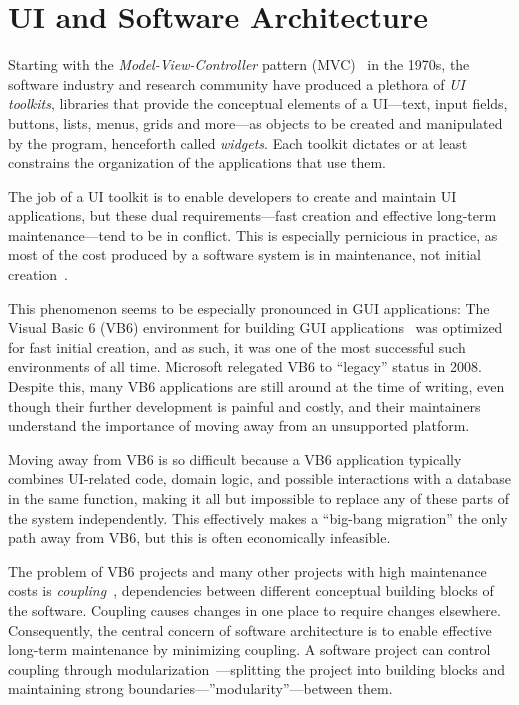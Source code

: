 \documentclass[sigplan,screen]{acmart}
\begin{document}
\section{UI and Software Architecture}
\label{sec:ui-and-architecture}

Starting with the \textit{Model-View-Controller} pattern
(MVC)~\cite{MVC} in the 1970s, the software
industry and research community have produced a plethora of \textit{UI
  toolkits}, libraries that provide the conceptual elements of a
UI---text, input fields, buttons, lists, menus, grids and more---as
objects to be created and manipulated by the program, henceforth
called \textit{widgets}.  Each toolkit dictates or at least
constrains the organization of the applications that use them.

The job of a UI toolkit is to enable developers to create and maintain
UI applications, but these dual requirements---fast creation and
effective long-term maintenance---tend to be in conflict.  This is especially pernicious in
practice, as most of the cost produced by a software system is in
maintenance, not initial creation~\cite{GreenBook}.

This phenomenon seems to be especially pronounced in GUI applications:
The Visual Basic 6 (VB6) environment for building GUI
applications~\cite{VB6} was optimized for fast initial creation, and
as such, it was one of the most successful such environments of all time.
Microsoft relegated VB6 to ``legacy'' status in 2008. Despite this,
many VB6 applications are still around at the time of writing, even
though their further development is painful and costly, and their
maintainers understand the importance of moving away from an
unsupported platform.

Moving away from VB6 is so difficult because a VB6 application
typically combines UI-related code, domain logic, and possible
interactions with a database in the same function, making it
all but impossible to replace any of these parts of the system
independently.  This effectively makes a ``big-bang migration'' the only
path away from VB6, but this is often economically
infeasible.

The problem of VB6 projects and many other projects with
high maintenance costs is \textit{coupling}~\cite{GreenBook},
dependencies between different conceptual building blocks of the
software. Coupling causes changes in one place to require changes 
elsewhere.  Consequently, the central concern of software
architecture is to enable effective long-term maintenance by minimizing
coupling.  A software project can control coupling through 
{modularization}~\cite{Modularity}---splitting the
project into building blocks and maintaining strong boundaries---''modularity''---between
them.
\end{document}

